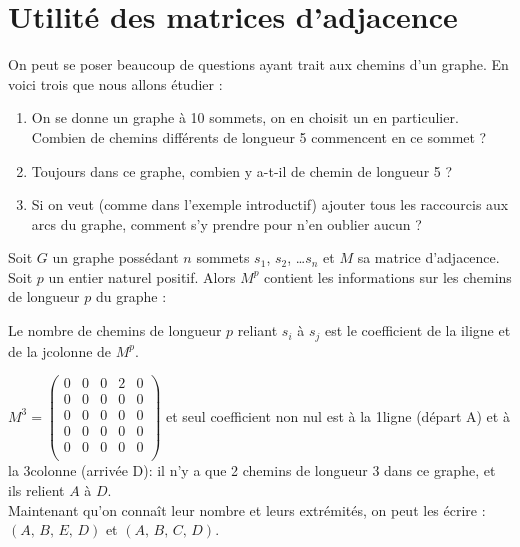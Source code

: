 \documentclass[a4paper,12pt]{book}
\begin{document}
\section{Utilité des matrices d'adjacence}
On peut se poser beaucoup de questions ayant trait aux chemins d'un graphe. En voici trois que nous allons étudier :
\begin{enumerate}[--]
	\item 	On se donne un graphe à 10 sommets, on en choisit un en particulier. Combien de chemins différents de longueur 5 commencent en ce sommet ?
	\item 	Toujours dans ce graphe, combien y a-t-il de chemin de longueur 5 ?
	\item 	Si on veut (comme dans l'exemple introductif) ajouter tous les \og raccourcis\fg{} aux arcs du graphe, comment s'y prendre pour n'en oublier aucun ?
\end{enumerate}



\begin{propriete}[]
Soit $G$ un graphe possédant $n$ sommets $s_1$, $s_2$, \ldots $s_n$ et $M$ sa matrice d'adjacence.\\
Soit $p$ un entier naturel positif. Alors $M^p$ contient les informations sur les chemins de longueur $p$ du graphe :

Le nombre de chemins de longueur $p$ reliant $s_i$ à $s_j$ est le coefficient de la i\eme ligne et de la j\eme colonne de $M^p$.
\end{propriete}

\begin{exemple}[]

$M^3 = \begin{pmatrix}
0 & 0 & 0 & 2 & 0\\
0 & 0 & 0 & 0 & 0\\
0 & 0 & 0 & 0 & 0\\
0 & 0 & 0 & 0 & 0\\
0 & 0 & 0 & 0 & 0\\
\end{pmatrix}$ et seul coefficient non nul est à la 1\ere ligne (départ A) et à la 3\eme colonne (arrivée D): il n'y a que 2 chemins de longueur 3 dans ce graphe, et ils relient $A$ à $D$.\\
Maintenant qu'on connaît leur nombre et leurs extrémités, on peut les écrire : $(A,\,B,\,E,\,D)$ et $(A,\,B,\,C,\,D)$.
\end{exemple}
\end{document}
